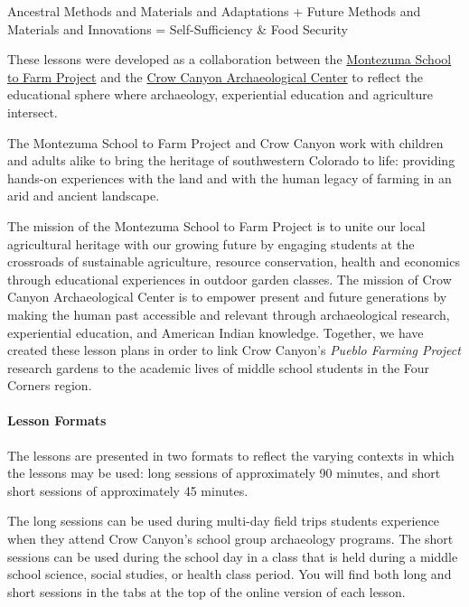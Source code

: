 \documentclass[12pt,]{article}
\let\oldparagraph\paragraph
\renewcommand{\paragraph}[1]{\oldparagraph{#1}\mbox{}}
\begin{document}
Ancestral Methods and Materials and Adaptations
+
Future Methods and Materials and Innovations
=
Self-Sufficiency \& Food Security

These lessons were developed as a collaboration between the \href{http://www.montezumaschooltofarm.org/}{Montezuma School to Farm Project} and the \href{http://www.crowcanyon.org/}{Crow Canyon Archaeological Center} to reflect the educational sphere where archaeology, experiential education and agriculture intersect.

The Montezuma School to Farm Project and Crow Canyon work with children and adults alike to bring the heritage of southwestern Colorado to life: providing hands-on experiences with the land and with the human legacy of farming in an arid and ancient landscape.

The mission of the Montezuma School to Farm Project is to unite our local agricultural heritage with our growing future by engaging students at the crossroads of sustainable agriculture, resource conservation, health and economics through educational experiences in outdoor garden classes. The mission of Crow Canyon Archaeological Center is to empower present and future generations by making the human past accessible and relevant through archaeological research, experiential education, and American Indian knowledge. Together, we have created these lesson plans in order to link Crow Canyon's \emph{Pueblo Farming Project} research gardens to the academic lives of middle school students in the Four Corners region.

\hypertarget{lesson-formats}{%
\paragraph{Lesson Formats}\label{lesson-formats}}

The lessons are presented in two formats to reflect the varying contexts in which the lessons may be used: long sessions of approximately 90 minutes, and short short sessions of approximately 45 minutes.

The long sessions can be used during multi-day field trips students experience when they attend Crow Canyon's school group archaeology programs. The short sessions can be used during the school day in a class that is held during a middle school science, social studies, or health class period. You will find both long and short sessions in the tabs at the top of the online version of each lesson.
\end{document}
